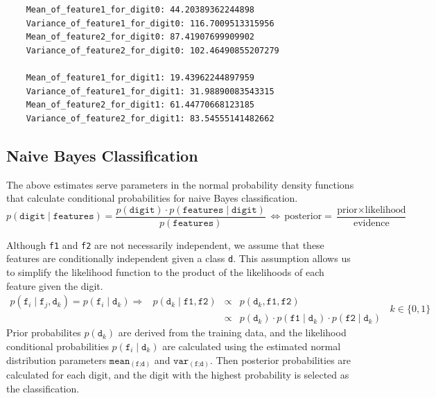 \documentclass{article}
\begin{document}
\begin{center}
\begin{tcolorbox}[width=0.9\textwidth]
\begin{verbatim}
    Mean_of_feature1_for_digit0: 44.20389362244898
    Variance_of_feature1_for_digit0: 116.7009513315956
    Mean_of_feature2_for_digit0: 87.41907699909902
    Variance_of_feature2_for_digit0: 102.46490855207279

    Mean_of_feature1_for_digit1: 19.43962244897959
    Variance_of_feature1_for_digit1: 31.98890083543315
    Mean_of_feature2_for_digit1: 61.44770668123185
    Variance_of_feature2_for_digit1: 83.54555141482662
\end{verbatim}
\end{tcolorbox}
\end{center}
\;
\subsection*{Naive Bayes Classification}

The above estimates serve parameters in the normal probability density functions that calculate conditional probabilities for naive Bayes classification.
$${\displaystyle p(\texttt{digit}\mid \texttt{features} )={\frac {p(\texttt{digit})\cdot p(\texttt{features}\mid\texttt{digit})}{p(\texttt{features})}}\, \Leftrightarrow \, \text{posterior}={\frac {{\text{prior}}\times {\text{likelihood}}}{\text{evidence}}} }$$

Although \texttt{f1} and \texttt{f2} are not necessarily independent, we assume that these features are conditionally independent given a class \texttt{d}. This assumption allows us to simplify the likelihood function to the product of the likelihoods of each feature given the digit.
$$
\begin{array}{cccl}
p(\texttt{f}_i\mid \texttt{f}_j, \texttt{d}_k)=p(\texttt{f}_i\mid \texttt{d}_k) \Rightarrow & p(\texttt{d}_k\mid \texttt{f1},\texttt{f2}) &\propto& p(\texttt{d}_k,\texttt{f1}, \texttt{f2})\\
&&\propto& p(\texttt{d}_k)\cdot p(\texttt{f1}\mid \texttt{d}_k) \cdot p(\texttt{f2}\mid \texttt{d}_k)
\end{array}\;\ k \in\{0,1\}
$$
Prior probabilites $p(\texttt{d}_k)$ are derived from the training data, and the likelihood conditional probabilities $p(\texttt{f}_i\mid \texttt{d}_k)$ are calculated using the estimated normal distribution parameters $\texttt{mean}_{(\texttt{f;d})}$ and $\texttt{var}_{(\texttt{f;d})}$. Then posterior probabilities are calculated for each digit, and the digit with the highest probability is selected as the classification.
\end{document}
